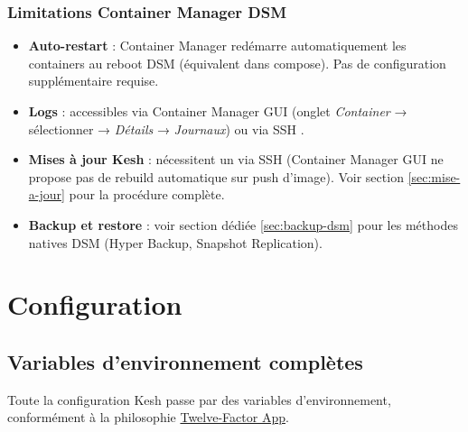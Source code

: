 \documentclass[a4paper,11pt,oneside]{article}
\begin{document}
\subsubsection{Limitations Container Manager DSM}

\begin{itemize}
    \item \textbf{Auto-restart} : Container Manager redémarre automatiquement les containers au reboot DSM (équivalent  dans compose). Pas de configuration supplémentaire requise.
    \item \textbf{Logs} : accessibles via Container Manager GUI (onglet \emph{Container} → sélectionner  → \emph{Détails} → \emph{Journaux}) ou via SSH .
    \item \textbf{Mises à jour Kesh} : nécessitent un  via SSH (Container Manager GUI ne propose pas de rebuild automatique sur push d'image). Voir section \ref{sec:mise-a-jour} pour la procédure complète.
    \item \textbf{Backup et restore} : voir section dédiée \ref{sec:backup-dsm} pour les méthodes natives DSM (Hyper Backup, Snapshot Replication).
\end{itemize}

\fussy
\section{Configuration}\label{sec:configuration}

\subsection{Variables d'environnement complètes}\label{sec:env-vars}

Toute la configuration Kesh passe par des variables d'environnement, conformément à la philosophie \href{https://12factor.net/config}{Twelve-Factor App}.
\end{document}
